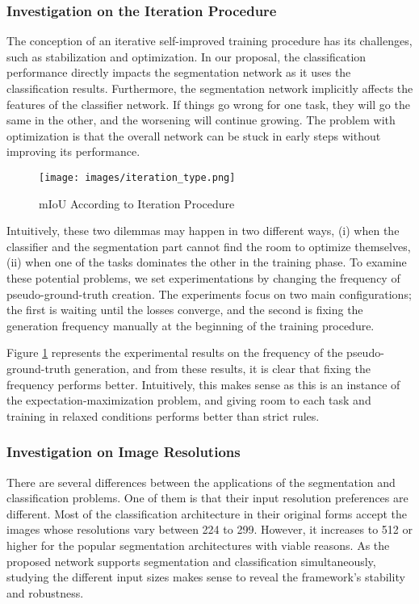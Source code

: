 \documentclass[sn-mathphys]{sn-jnl}
\theoremstyle{thmstyleone}
\theoremstyle{thmstyletwo}\newtheorem{example}{Example}\newtheorem{remark}{Remark}
\theoremstyle{thmstylethree}\newtheorem{definition}{Definition}
\begin{document}
\subsubsection{Investigation on the Iteration Procedure}

The conception of an iterative self-improved training procedure has its challenges, such as stabilization and optimization. In our proposal, the classification performance directly impacts the segmentation network as it uses the classification results. Furthermore, the segmentation network implicitly affects the features of the classifier network. If things go wrong for one task, they will go the same in the other, and the worsening will continue growing. The problem with optimization is that the overall network can be stuck in early steps without improving its performance. 

\begin{figure}[!ht]
    \centering
    \texttt{[image: images/iteration\_type.png]}
    \caption{mIoU According to Iteration Procedure}
    \label{label_generation}
\end{figure}

Intuitively, these two dilemmas may happen in two different ways, (i) when the classifier and the segmentation part cannot find the room to optimize themselves,  (ii) when one of the tasks dominates the other in the training phase. To examine these potential problems, we set experimentations by changing the frequency of pseudo-ground-truth creation. The experiments focus on two main configurations; the first is waiting until the losses converge, and the second is fixing the generation frequency manually at the beginning of the training procedure.

Figure \ref{label_generation} represents the experimental results on the frequency of the pseudo-ground-truth generation, and from these results, it is clear that fixing the frequency performs better. Intuitively, this makes sense as this is an instance of the expectation-maximization problem, and giving room to each task and training in relaxed conditions performs better than strict rules.


\subsubsection{Investigation on Image Resolutions}

There are several differences between the applications of the segmentation and classification problems. One of them is that their input resolution preferences are different. Most of the classification architecture in their original forms accept the images whose resolutions vary between 224 to 299. However, it increases to 512 or higher for the popular segmentation architectures with viable reasons. As the proposed network supports segmentation and classification simultaneously, studying the different input sizes makes sense to reveal the framework's stability and robustness.
\end{document}
